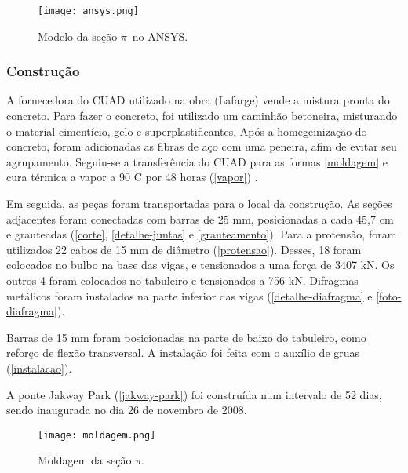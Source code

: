 \begin{figure}[htb]
	\caption{\label{ansys}Modelo da seção $ \pi $~no ANSYS.}
	\begin{center}
		\texttt{[image: ansys.png]}
	\end{center}
\end{figure}

\subsubsection{Construção}

A fornecedora do CUAD utilizado na obra (Lafarge) vende a mistura pronta do concreto. Para fazer o concreto, foi utilizado um caminhão betoneira, misturando o material cimentício, gelo e superplastificantes. Após a homegeinização do concreto, foram adicionadas as fibras de aço com uma peneira, afim de evitar seu agrupamento. Seguiu-se a transferência do CUAD para as formas \autoref{moldagem} e cura térmica a vapor a 90 \textsuperscript{\degree}C por 48 horas (\autoref{vapor}) \cite[p.~17]{Rouse}.


Em seguida, as peças foram transportadas para o local da construção. As seções adjacentes foram conectadas com barras de 25 mm, posicionadas a cada 45,7 cm e grauteadas (\autoref{corte}, \autoref{detalhe-juntas}  e \autoref{grauteamento}). Para a protensão, foram utilizados 22 cabos de 15 mm de diâmetro (\autoref{protensao}). Desses, 18 foram colocados no bulbo na base das vigas, e tensionados a uma força de 3407 kN. Os outros 4 foram colocados no tabuleiro e tensionados a 756 kN. Difragmas metálicos foram instalados na parte inferior das vigas (\autoref{detalhe-diafragma} e \autoref{foto-diafragma}).

Barras de 15 mm foram posicionadas na parte de baixo do tabuleiro, como reforço de flexão transversal. A instalação foi feita com o auxílio de gruas (\autoref{instalacao}).

A ponte Jakway Park (\autoref{jakway-park}) foi construída num intervalo de 52 dias, sendo inaugurada no dia 26 de novembro de 2008.

\begin{figure}[htb]
	\caption{\label{moldagem}Moldagem da seção $ \pi $.}
	\begin{center}
		\texttt{[image: moldagem.png]}
	\end{center}
\end{figure}

